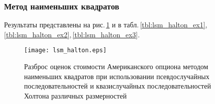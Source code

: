 \subsubsection{Метод наименьших квадратов} %
\label{ssub:results:qmc_to_classical:halton:lsm}

Результаты представлены на рис.\,\ref{fig:lsm_halton} и в табл.\,\ref{tbl:lsm_halton_ex1},\,\ref{tbl:lsm_halton_ex2},\,\ref{tbl:lsm_halton_ex3}.

\begin{figure}[p]
    \centering
    \texttt{[image: lsm\_halton.eps]}
    \caption{Разброс оценок стоимости Американского опциона методом наименьших квадратов при использовании псевдослучайных последовательностей и квазислучайных последовательностей Холтона различных размерностей}
    \label{fig:lsm_halton}
\end{figure}

